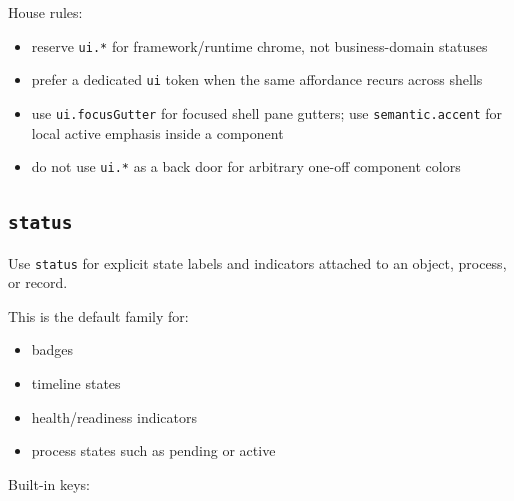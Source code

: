House rules:

\begin{itemize}
\tightlist
\item
  reserve \texttt{u\allowbreak{}i\allowbreak{}.\allowbreak{}*} for framework/runtime chrome, not business-domain statuses
\item
  prefer a dedicated \texttt{u\allowbreak{}i} token when the same affordance recurs across shells
\item
  use \texttt{u\allowbreak{}i\allowbreak{}.\allowbreak{}f\allowbreak{}o\allowbreak{}c\allowbreak{}u\allowbreak{}s\allowbreak{}G\allowbreak{}u\allowbreak{}t\allowbreak{}t\allowbreak{}e\allowbreak{}r} for focused shell pane gutters; use \texttt{s\allowbreak{}e\allowbreak{}m\allowbreak{}a\allowbreak{}n\allowbreak{}t\allowbreak{}i\allowbreak{}c\allowbreak{}.\allowbreak{}a\allowbreak{}c\allowbreak{}c\allowbreak{}e\allowbreak{}n\allowbreak{}t} for local active emphasis inside a component
\item
  do not use \texttt{u\allowbreak{}i\allowbreak{}.\allowbreak{}*} as a back door for arbitrary one-off component colors
\end{itemize}

\subsection{\texorpdfstring{\texttt{s\allowbreak{}t\allowbreak{}a\allowbreak{}t\allowbreak{}u\allowbreak{}s}}{}}\label{record-028-status}

Use \texttt{s\allowbreak{}t\allowbreak{}a\allowbreak{}t\allowbreak{}u\allowbreak{}s} for explicit state labels and indicators attached to an object, process, or record.

This is the default family for:

\begin{itemize}
\tightlist
\item
  badges
\item
  timeline states
\item
  health/readiness indicators
\item
  process states such as pending or active
\end{itemize}

Built-in keys:


